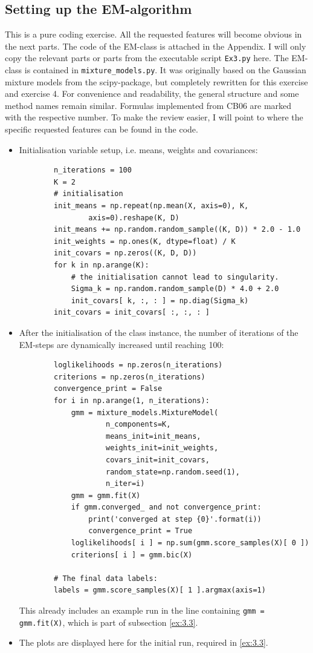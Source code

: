 \subsection{Setting up the EM-algorithm}\label{ex:3.2}
This is a pure coding exercise. All the requested features will become obvious in the next parts. The code of the EM-class is attached in the Appendix. I will only copy the relevant parts or parts from the executable script \texttt{Ex3.py} here.
The EM-class is contained in \texttt{mixture\_models.py}. It was originally based on the Gaussian mixture models from the scipy-package, but completely rewritten for this exercise and exercise 4.
For convenience and readability, the general structure and some method names remain similar.
Formulas implemented from CB06 are marked with the respective number.
To make the review easier, I will point to where the specific requested features can be found in the code.
\begin{itemize}
\item Initialisation variable setup, i.e. means, weights and covariances: 
\begin{verbatim}
        n_iterations = 100
        K = 2
        # initialisation
        init_means = np.repeat(np.mean(X, axis=0), K,
		        axis=0).reshape(K, D)
        init_means += np.random.random_sample((K, D)) * 2.0 - 1.0
        init_weights = np.ones(K, dtype=float) / K
        init_covars = np.zeros((K, D, D))
        for k in np.arange(K):
            # the initialisation cannot lead to singularity.
            Sigma_k = np.random.random_sample(D) * 4.0 + 2.0
            init_covars[ k, :, : ] = np.diag(Sigma_k)
        init_covars = init_covars[ :, :, : ]
\end{verbatim}
\item After the initialisation of the class instance, the number of iterations of the EM-steps are dynamically increased until reaching 100:
\begin{verbatim}
        loglikelihoods = np.zeros(n_iterations)
        criterions = np.zeros(n_iterations)
        convergence_print = False
        for i in np.arange(1, n_iterations):
            gmm = mixture_models.MixtureModel(
                    n_components=K,
                    means_init=init_means,
                    weights_init=init_weights,
                    covars_init=init_covars,
                    random_state=np.random.seed(1),
                    n_iter=i)
            gmm = gmm.fit(X)
            if gmm.converged_ and not convergence_print:
                print('converged at step {0}'.format(i))
                convergence_print = True
            loglikelihoods[ i ] = np.sum(gmm.score_samples(X)[ 0 ])
            criterions[ i ] = gmm.bic(X)

        # The final data labels:
        labels = gmm.score_samples(X)[ 1 ].argmax(axis=1)
\end{verbatim}
This already includes an example run in the line containing \texttt{gmm = gmm.fit(X)}, which is part of subsection \ref{ex:3.3}.
\item The plots are displayed here for the initial run, required in \ref{ex:3.3}.
\end{itemize}

